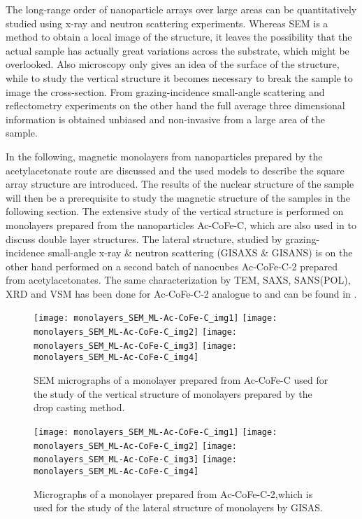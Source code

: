 \documentclass[\main/dresen_thesis.tex]{subfiles}
\begin{document}
  The long-range order of nanoparticle arrays over large areas can be quantitatively studied using x-ray and neutron scattering experiments.
  Whereas SEM is a method to obtain a local image of the structure, it leaves the possibility that the actual sample has actually great variations across the substrate, which might be overlooked.
  Also microscopy only gives an idea of the surface of the structure, while to study the vertical structure it becomes necessary to break the sample to image the cross-section.
  From grazing-incidence small-angle scattering and reflectometry experiments on the other hand the full average three dimensional information is obtained unbiased and non-invasive from a large area of the sample.

  In the following, magnetic monolayers from nanoparticles prepared by the acetylacetonate route are discussed and the used models to describe the square array structure are introduced.
  The results of the nuclear structure of the sample will then be a prerequisite to study the magnetic structure of the samples in the following section.
  The extensive study of the vertical structure is performed on monolayers prepared from the nanoparticles Ac-CoFe-C, which are also used in  to discuss double layer structures.
  The lateral structure, studied by grazing-incidence small-angle x-ray \& neutron scattering (GISAXS \& GISANS) is on the other hand performed on a second batch of nanocubes Ac-CoFe-C-2 prepared from acetylacetonates.
  The same characterization by TEM, SAXS, SANS(POL), XRD and VSM has been done for Ac-CoFe-C-2 analogue to  and can be found in .

  \begin{figure}[tb]
    \centering
    \texttt{[image: monolayers\_SEM\_ML-Ac-CoFe-C\_img1]}
    \texttt{[image: monolayers\_SEM\_ML-Ac-CoFe-C\_img2]}
    \texttt{[image: monolayers\_SEM\_ML-Ac-CoFe-C\_img3]}
    \texttt{[image: monolayers\_SEM\_ML-Ac-CoFe-C\_img4]}
    \caption{\label{fig:monolayers:structure:semImagesMLACCoFeC}SEM micrographs of a monolayer prepared from Ac-CoFe-C used for the study of the vertical structure of monolayers prepared by the drop casting method.}
  \end{figure}

  \begin{figure}[tb]
    \centering
    \texttt{[image: monolayers\_SEM\_ML-Ac-CoFe-C\_img1]}
    \texttt{[image: monolayers\_SEM\_ML-Ac-CoFe-C\_img2]}
    \texttt{[image: monolayers\_SEM\_ML-Ac-CoFe-C\_img3]}
    \texttt{[image: monolayers\_SEM\_ML-Ac-CoFe-C\_img4]}
    \caption{\label{fig:monolayers:structure:semImagesMLACCoFeC}Micrographs of a monolayer prepared from Ac-CoFe-C-2,which is used for the study of the lateral structure of monolayers by GISAS.}
  \end{figure}
\end{document}
